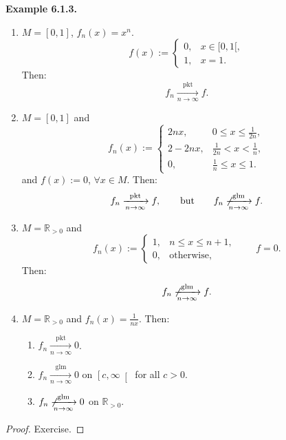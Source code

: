 \documentclass[12pt]{article}
\begin{document}
\par\vspace{6pt}\noindent\textbf{Example 6.1.3.}\itshape\space
\begin{enumerate}
    \item $M=[0,1]$, $f_n(x)=x^n$.
    \[
    f(x):=
    \begin{cases}
    0, & x\in[0,1[,\\
    1, & x=1.
    \end{cases}
    \]
    Then:
    \[
    f_n \xrightarrow[n\to\infty]{\mathrm{pkt}} f.
    \]

    \item $M=[0,1]$ and
    \[
    f_n(x):=
    \begin{cases}
    2nx, & 0\le x\le \frac{1}{2n},\\[1mm]
    2-2nx, & \frac{1}{2n}<x<\frac{1}{n},\\[1mm]
    0, & \frac{1}{n}\le x\le 1.
    \end{cases}
    \]
    and $f(x):=0$, $\forall x\in M$. Then:
    \[
    f_n \xrightarrow[n\to\infty]{\mathrm{pkt}} f,
    \qquad\text{but}\qquad
    f_n \not\xrightarrow[n\to\infty]{\mathrm{glm}} f.
    \]

    \item $M=\mathbb{R}_{>0}$ and
    \[
    f_n(x):=
    \begin{cases}
    1, & n\le x\le n+1,\\
    0, & \text{otherwise},
    \end{cases}
    \qquad f=0.
    \]
    Then:
    \[
    f_n \not\xrightarrow[n\to\infty]{\mathrm{glm}} f.
    \]

    \item $M=\mathbb{R}_{>0}$ and $f_n(x)=\frac{1}{nx}$. Then:
    \begin{enumerate}
        \item $f_n \xrightarrow[n\to\infty]{\mathrm{pkt}} 0$.
        \item $f_n \xrightarrow[n\to\infty]{\mathrm{glm}} 0$ on $\left[c,\infty\right[$ for all $c>0$.
        \item $f_n \not\xrightarrow[n\to\infty]{\mathrm{glm}} 0$ on $\mathbb{R}_{>0}$.
    \end{enumerate}
\end{enumerate}
\upshape

\begin{proof}
Exercise.
\end{proof}

\end{document}
